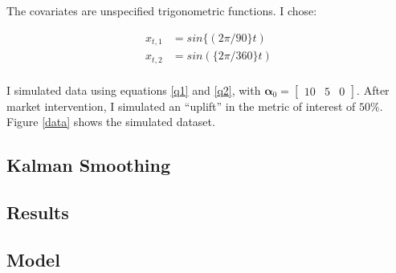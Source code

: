 \documentclass[12pt]{article}
\begin{document}
The covariates are unspecified trigonometric functions. I chose:

\begin{align*}
    x_{t, 1} &= sin\{(2\pi/90\}  t) \\
x_{t, 2} &= sin(\{2\pi/360\}  t)\\
\end{align*}

I simulated data using equations \ref{q1} and \ref{q2}, with $\boldsymbol{\alpha}_0 = \begin{bmatrix} 10 &5 & 0
\end{bmatrix} $. After market intervention, I simulated an ``uplift'' in the metric of interest of $50\%$. Figure \ref{data} shows the simulated dataset. 




\subsection{Kalman Smoothing}


\subsection{Results}

\subsection{Model}



 

\end{document}
